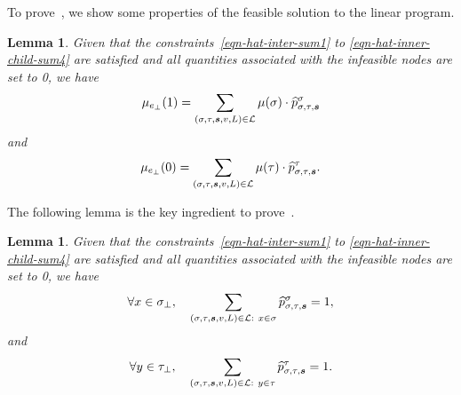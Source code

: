 \documentclass[11pt]{article}
\newtheorem{lemma}[theorem]{Lemma}
\newcommand{\seqS}{\boldsymbol{s}}
\newcommand{\hktodo}[1]{{\color{blue}{#1}}}
\begin{document}
To prove~, we show some properties of the feasible solution to the linear program.

\begin{lemma} \label{lem:ratio-identity}
    Given that the constraints~\eqref{eqn-hat-inter-sum1} to \eqref{eqn-hat-inner-child-sum4} are satisfied and all quantities associated with the infeasible nodes are set to 0, we have
    \begin{align*}
        \mu_{e_{\bot}}(1) = \sum_{(\sigma, \tau, \seqS,v,L) \in \+L}\mu(\sigma)\cdot\widehat{p}_{\sigma, \tau, \seqS}^{\sigma} 
    \end{align*}
    and
    \begin{align*}
        \mu_{e_{\bot}}(0)  = \sum_{(\sigma, \tau, \seqS,v,L) \in \+L}\mu(\tau)\cdot\widehat{p}_{\sigma, \tau, \seqS}^{\tau}.
    \end{align*}
\end{lemma}

The following lemma is the key ingredient to prove~.

\hktodo{Whether the check of an infeasible node is efficient}

\hktodo{the condition of this lemma}

\begin{lemma} \label{lem:ratio-identity-partial}
     Given that the constraints~\eqref{eqn-hat-inter-sum1} to \eqref{eqn-hat-inner-child-sum4} are satisfied and all quantities associated with the infeasible nodes are set to 0, we have
    \begin{align}\label{eqn-sum-leftside}
        \forall x\in \sigma_\bot, \quad \sum_{(\sigma,\tau, \seqS,v,L)\in \+L: \ x\in \sigma} \widehat{p}^{\sigma}_{\sigma,\tau,\seqS}=1,
    \end{align}
    and
    \begin{align}\label{eqn-sum-rightside}
        \forall y\in \tau_\bot, \quad \sum_{(\sigma,\tau, \seqS,v,L)\in \+L: \ y\in \tau} \widehat{p}^{\tau}_{\sigma,\tau, \seqS}=1.
    \end{align}
\end{lemma}

\hktodo{whether we should prove this lemma on the feasible set $\+L$}
\end{document}
